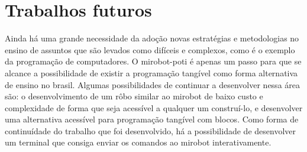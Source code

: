 \section{Trabalhos futuros}

Ainda há uma grande necessidade da adoção novas estratégias e metodologias no
ensino de assuntos que são levados como difíceis e complexos, como é o exemplo
da programação de computadores. O mirobot-poti é apenas um passo para que se
alcance a possibilidade de existir a programação tangível como forma
alternativa de ensino no brasil. Algumas possibilidades de continuar a
desenvolver nessa área são: o desenvolvimento de um rôbo similar ao mirobot de
baixo custo e complexidade de forma que seja acessível a qualquer um
construí-lo, e desenvolver uma alternativa acessível para programação tangível
com blocos. Como forma de continuídade do trabalho que foi desenvolvido, há a
possibilidade de desenvolver um terminal que consiga enviar os comandos ao
mirobot interativamente. 

